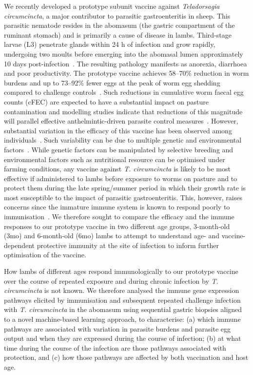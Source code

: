 \documentclass[a4paper, hidelinks, 11pt]{article}
\begin{document}
We recently developed a prototype subunit vaccine against \emph{Teladorsagia
circumcincta}, a major contributor to parasitic gastroenteritis in sheep. This
parasitic nematode resides in the abomasum (the gastric compartment of the
ruminant stomach) and is primarily a cause of disease in lambs. Third-stage
larvae (L3) penetrate glands within 24 h of infection and grow rapidly,
undergoing two moults before emerging into the abomasal lumen approximately 10
days post-infection~\supercite{McNeilly2009}. The resulting pathology manifests
as anorexia, diarrhoea and poor productivity. The prototype vaccine achieves
58–70\% reduction in worm burdens and up to 73–92\% fewer eggs at the peak of
worm egg shedding compared to challenge controls~\supercite{Nisbet2013}. Such
reductions in cumulative worm faecal egg counts (cFEC) are expected to have a
substantial impact on pasture contamination and modelling studies indicate that
reductions of this magnitude will parallel effective anthelmintic-driven
parasite control measures~\supercite{Barnes1995}. However, substantial variation
in the efficacy of this vaccine has been observed among
individuals~\supercite{Nisbet2013, Nisbet2019}. Such variability can be due to
multiple genetic and environmental factors~\supercite{Stear1997, Nussey2014,
Grencis2015}. While genetic factors can be manipulated by selective breeding and
environmental factors such as nutritional resource can be optimised under
farming conditions, any vaccine against \emph{T. circumcincta} is likely to be
most effective if administered to lambs before exposure to worms on pasture and
to protect them during the late spring/summer period in which their growth rate
is most susceptible to the impact of parasitic gastroenteritis. This, however,
raises concerns since the immature immune system is known to respond poorly to
immunisation~\supercite{McClure1998, McRae2015, Babayan2018b}. We therefore
sought to compare the efficacy and the immune responses to our prototype vaccine
in two different age groups, 3-month-old (3mo) and 6-month-old (6mo) lambs to
attempt to understand age- and vaccine-dependent protective immunity at the site
of infection to inform further optimisation of the vaccine.

How lambs of different ages respond immunologically to our prototype vaccine
over the course of repeated exposure and during chronic infection by \emph{T.
circumcincta} is not known. We therefore analysed the immune gene expression
pathways elicited by immunisation and subsequent repeated challenge infection
with \emph{T. circumcincta} in the abomasum using sequential gastric biopsies
aligned to a novel machine-based learning approach, to characterise: (a) which
immune pathways are associated with variation in parasite burdens and parasite
egg output and when they are expressed during the course of infection; (b) at
what time during the course of the infection are those pathways associated with
protection, and (c) how those pathways are affected by both vaccination and
host age.
\end{document}
